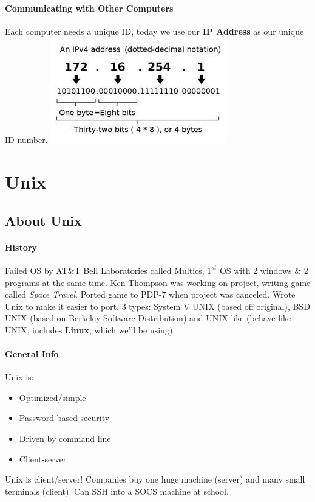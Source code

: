 \documentclass[12 pt]{article}
\begin{document}
	\paragraph{Communicating with Other Computers} Each computer needs a unique ID, today we use our \textbf{IP Address} as our unique ID number. \includegraphics{ipv4}
	\section{Unix}
	\subsection{About Unix}
	\paragraph{History}
	Failed OS by AT\&T Bell Laboratories called Multics, $1^{st}$ OS with 2 windows \& 2 programs at the same time. Ken Thompson was working on project, writing game called \textit{Space Travel}. Ported game to PDP-7 when project was canceled. Wrote Unix to make it easier to port. 3 types: System V UNIX (based off original), BSD UNIX (based on Berkeley Software Distribution) and UNIX-like (behave like UNIX, includes \textbf{Linux}, which we'll be using).
	\paragraph{General Info} Unix is:
	\begin{itemize}
		\item Optimized/simple
		\item Password-based security
		\item Driven by command line
		\item Client-server
		\end{itemize}
		Unix is client/server! Companies buy one huge machine (server) and many small terminals (client). Can SSH into a SOCS machine at school.
\end{document}
